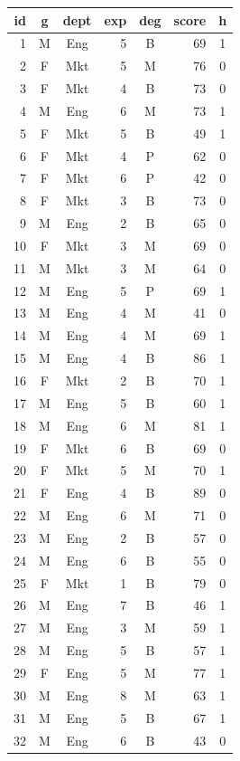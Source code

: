 \documentclass[11pt,a4paper]{article}
\renewcommand{\arraystretch}{1.15}
\begin{document}
\begin{center}\scriptsize\setlength{\tabcolsep}{3.5pt}\renewcommand{\arraystretch}{1.0}
\begin{tabular}[t]{@{}r c c r c r c@{}}
\toprule
id & g & dept & exp & deg & score & h \\
\midrule
1 & M & Eng & 5 & B & 69 & 1 \\
2 & F & Mkt & 5 & M & 76 & 0 \\
3 & F & Mkt & 4 & B & 73 & 0 \\
4 & M & Eng & 6 & M & 73 & 1 \\
5 & F & Mkt & 5 & B & 49 & 1 \\
6 & F & Mkt & 4 & P & 62 & 0 \\
7 & F & Mkt & 6 & P & 42 & 0 \\
8 & F & Mkt & 3 & B & 73 & 0 \\
9 & M & Eng & 2 & B & 65 & 0 \\
10 & F & Mkt & 3 & M & 69 & 0 \\
11 & M & Mkt & 3 & M & 64 & 0 \\
12 & M & Eng & 5 & P & 69 & 1 \\
13 & M & Eng & 4 & M & 41 & 0 \\
14 & M & Eng & 4 & M & 69 & 1 \\
15 & M & Eng & 4 & B & 86 & 1 \\
16 & F & Mkt & 2 & B & 70 & 1 \\
17 & M & Eng & 5 & B & 60 & 1 \\
18 & M & Eng & 6 & M & 81 & 1 \\
19 & F & Mkt & 6 & B & 69 & 0 \\
20 & F & Mkt & 5 & M & 70 & 1 \\
21 & F & Eng & 4 & B & 89 & 0 \\
22 & M & Eng & 6 & M & 71 & 0 \\
23 & M & Eng & 2 & B & 57 & 0 \\
24 & M & Eng & 6 & B & 55 & 0 \\
25 & F & Mkt & 1 & B & 79 & 0 \\
26 & M & Eng & 7 & B & 46 & 1 \\
27 & M & Eng & 3 & M & 59 & 1 \\
28 & M & Eng & 5 & B & 57 & 1 \\
29 & F & Eng & 5 & M & 77 & 1 \\
30 & M & Eng & 8 & M & 63 & 1 \\
31 & M & Eng & 5 & B & 67 & 1 \\
32 & M & Eng & 6 & B & 43 & 0 \\

\end{tabular}
\end{center}
\end{document}
